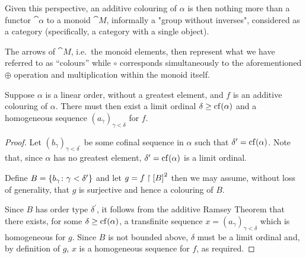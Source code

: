 Given this perspective, an additive colouring of $\alpha$ is then nothing more
than a functor $\cat{\alpha}$ to a monoid $\cat{M}$, informally a "group without
inverses", considered as a category (specifically, a category with a single
object).

The arrows of $\cat{M}$, i.e.\ the monoid elements, then represent what we have
referred to as ``colours'' while $\circ$ corresponds simultaneously to the
aforementioned $\oplus$ operation and multiplication within the monoid itself.

\begin{cor}
	Suppose $\alpha$ is a linear order, without a greatest element, and $f$ is
	an additive colouring of $\alpha$. There must then exist a limit ordinal
	$\delta\geq\cf(\alpha)$ and a homogeneous sequence
	$(a_\gamma)_{\gamma<\delta}$ for $f$.
\end{cor}

\begin{proof}
	Let $(b_\gamma)_{\gamma<\delta^\prime}$ be some cofinal sequence in $\alpha$
	such that $\delta^\prime=\cf(\alpha)$.  Note that, since $\alpha$ has no
	greatest element, $\delta^\prime=\cf(\alpha)$ is a limit ordinal.

	Define $B=\setbuild{b_\gamma}{\gamma<\delta^\prime}$ and let
	$g=f\restriction{\subsets{2}{B}}$ then we may assume, without loss of
	generality, that $g$ is surjective and hence a colouring of $B$.

	Since $B$ has order type $\delta^\prime$, it follows from the additive
	Ramsey Theorem that there exists, for some $\delta\geq\cf(\alpha)$, a
	transfinite sequence $x=(a_\gamma)_{\gamma<\delta}$ which is homogeneous for
	$g$.  Since $B$ is not bounded above, $\delta$ must be a limit ordinal and,
	by definition of $g$, $x$ is a homogeneous sequence for $f$, as required.
\end{proof}



